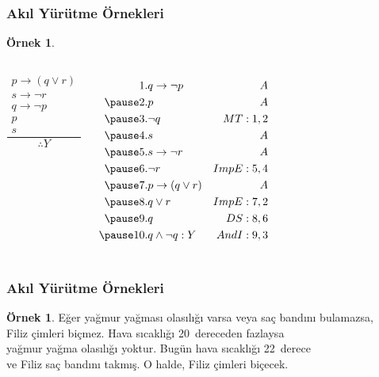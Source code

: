 \documentclass[dvipsnames]{beamer}
\theoremstyle{definition}
\theoremstyle{example}
\newtheorem{ornek}[theorem]{Örnek}
\theoremstyle{plain}
\begin{document}
\begin{frame}
  \frametitle{Akıl Yürütme Örnekleri}

  \begin{ornek}
    \begin{columns}
      \[
      \frac
        {
          \begin{array}{c}
            p \rightarrow (q \vee r)\\
            s \rightarrow \neg r\\
            q \rightarrow \neg p\\
            p\\
            s
          \end{array}
        }
        {
          \therefore Y
        }
      \]

      \pause
      \begin{eqnarray*}
        1. & q \rightarrow \neg p     & A\\
       \pause
        2. & p                        & A\\
       \pause
        3. & \neg q                   & MT:1,2\\
       \pause
        4. & s                        & A\\
       \pause
        5. & s \rightarrow \neg r     & A\\
       \pause
        6. & \neg r                   & ImpE:5,4\\
       \pause
        7. & p \rightarrow (q \vee r) & A\\
       \pause
        8. & q \vee r                 & ImpE:7,2\\
       \pause
        9. & q                        & DS:8,6\\
       \pause
       10. & q \wedge \neg q : Y      & AndI:9,3
      \end{eqnarray*}
    \end{columns}
  \end{ornek}
\end{frame}

\begin{frame}
  \frametitle{Akıl Yürütme Örnekleri}

  \begin{ornek}
    Eğer yağmur yağması olasılığı varsa veya saç bandını bulamazsa,\\
    Filiz çimleri biçmez. Hava sıcaklığı 20~dereceden fazlaysa\\
    yağmur yağma olasılığı yoktur. Bugün hava sıcaklığı 22~derece\\
    ve Filiz saç bandını takmış. O halde, Filiz çimleri biçecek.
  \end{ornek}
\end{frame}
\end{document}

